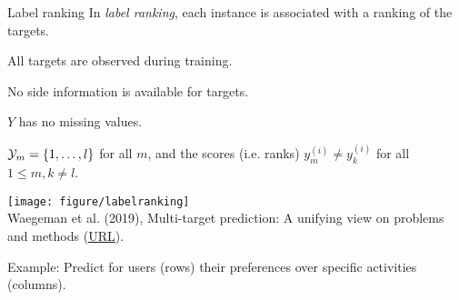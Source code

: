 \documentclass[11pt,compress,t,notes=noshow, xcolor=table]{beamer}
\newcommand{\yim}{y^{(i)}_m}
\begin{document}
\begin{frame}{Label ranking}
	\small
    In \emph{label ranking}, each instance is associated with a ranking of the targets. 

		\begin{enumerate}\small
			
			\begin{minipage}{0.45\textwidth}    
                \item All targets are observed during training. 
                \vspace{10pt}

    			\item No side information is available for targets. 		
                \vspace{10pt}
                
    			\item $Y$ has no missing values. 
                \vspace{10pt}
                
    			\item $\mathcal{Y}_m = \{1, \ldots , l\}$ for all $m$, and the scores (i.e. ranks) $\yim \neq y_{k}^{(i)}$ for all $1 \leq m,k \neq l$. 
                \vspace{10pt}
			\end{minipage}
            \hfill
			\begin{minipage}{0.45\textwidth}    
			\begin{center}
                \texttt{[image: figure/labelranking]} \tiny
				\\ Waegeman et al. (2019), Multi-target prediction:
				A unifying view on problems and methods (\href{https://arxiv.org/pdf/1809.02352.pdf}{\underline{URL}}).
 	
			\end{center}
		\end{minipage}
		\end{enumerate}
  
    \vspace{10pt}
	Example: Predict for users (rows) their preferences over specific activities (columns).
	
\end{frame}
\end{document}
